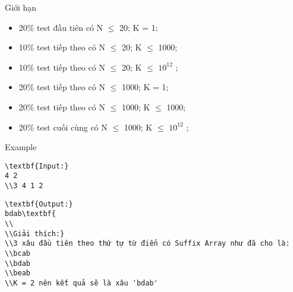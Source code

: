 Giới hạn
\begin{itemize}
	\item     20\% test đầu tiên có N  $\le$  20; K = 1;   
	\item     10\% test tiếp theo có N  $\le$  20; K  $\le$  1000;   
	\item     10\% test tiếp theo có N  $\le$  20; K  $\le$  $10^{12}$    ;   
	\item     20\% test tiếp theo có N  $\le$  1000; K = 1;   
	\item     20\% test tiếp theo có N  $\le$  1000; K  $\le$ 1000;   
	\item     20\% test cuối cùng có N  $\le$  1000; K  $\le$  $10^{12}$    ;   
\end{itemize}
Example
\begin{verbatim}
\textbf{Input:}
4 2
\\3 4 1 2\end{verbatim}
\begin{verbatim}
\textbf{Output:}
bdab\textbf{
\\
\\Giải thích:}
\\3 xâu đầu tiên theo thứ tự từ điển có Suffix Array như đã cho là:
\\bcab
\\bdab
\\beab
\\K = 2 nên kết quả sẽ là xâu 'bdab' \end{verbatim}